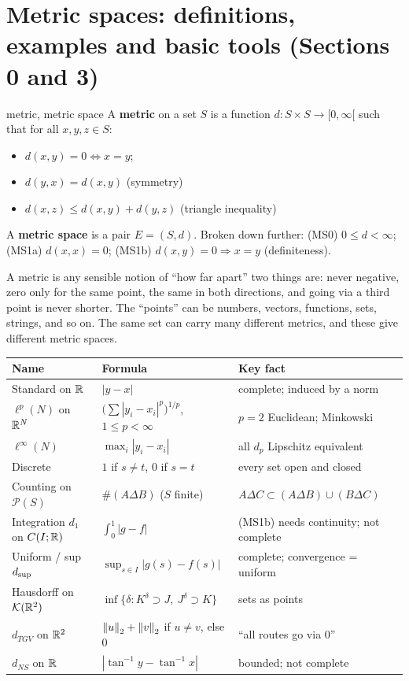 \section{Metric spaces: definitions, examples and basic tools (Sections 0 and 3)}

\begin{defn}{metric, metric space}
A \textbf{metric} on a set $S$ is a function $d:S\times S\to[0,\infty[$ such that for all
$x,y,z\in S$:
\begin{itemize}
\item[(MS1)] $d(x,y)=0\iff x=y$;
\item[(MS2)] $d(y,x)=d(x,y)$ \hfill (symmetry)
\item[(MS3)] $d(x,z)\le d(x,y)+d(y,z)$ \hfill (triangle inequality)
\end{itemize}
A \textbf{metric space} is a pair $E=(S,d)$. Broken down further: (MS0) $0\le d<\infty$;
(MS1a) $d(x,x)=0$; (MS1b) $d(x,y)=0\Rightarrow x=y$ (definiteness).
\end{defn}

\begin{plain}
A metric is any sensible notion of ``how far apart'' two things are: never negative, zero only
for the same point, the same in both directions, and going via a third point is never shorter.
The ``points'' can be numbers, vectors, functions, sets, strings, and so on. The same set can
carry many different metrics, and these give different metric spaces.
\end{plain}

\begin{center}
\renewcommand{\arraystretch}{1.25}
\begin{tabular}{@{}p{3.6cm}p{6.6cm}p{5.4cm}@{}}
\toprule
Name & Formula & Key fact\\\midrule
Standard on $\mathbb R$ & $|y-x|$ & complete; induced by a norm\\
$\ell^p(N)$ on $\mathbb R^N$ & $\big(\sum|y_i-x_i|^p\big)^{1/p}$, $1\le p<\infty$ & $p=2$ Euclidean; Minkowski\\
$\ell^\infty(N)$ & $\max_i|y_i-x_i|$ & all $d_p$ Lipschitz equivalent\\
Discrete & $1$ if $s\ne t$, $0$ if $s=t$ & every set open and closed\\
Counting on $\mathcal P(S)$ & $\#(A\Delta B)$ ($S$ finite) & $A\Delta C\subset(A\Delta B)\cup(B\Delta C)$\\
Integration $d_1$ on $C(I;\mathbb R)$ & $\int_0^1|g-f|$ & (MS1b) needs continuity; not complete\\
Uniform / sup $d_{\sup}$ & $\sup_{s\in I}|g(s)-f(s)|$ & complete; convergence = uniform\\
Hausdorff on $\mathcal K(\mathbb R^2)$ & $\inf\{\delta: K^\delta\supset J,\ J^\delta\supset K\}$ & sets as points\\
$d_{TGV}$ on $\mathbb R^2$ & $\left\lVert u\right\rVert_2+\left\lVert v\right\rVert_2$ if $u\ne v$, else $0$ & ``all routes go via $0$''\\
$d_{NS}$ on $\mathbb R$ & $|\tan^{-1}y-\tan^{-1}x|$ & bounded; not complete\\
\bottomrule
\end{tabular}
\end{center}

